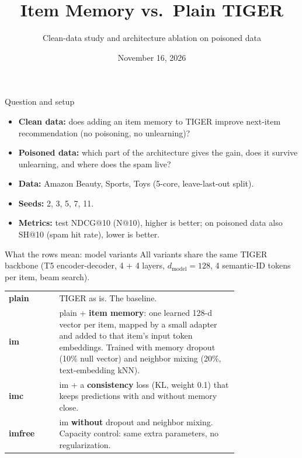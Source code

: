 \documentclass{beamer}
\title{Item Memory vs.\ Plain TIGER}
\subtitle{Clean-data study and architecture ablation on poisoned data}
\date{November 16, 2026}
\begin{document}
\maketitle

\begin{frame}{Question and setup}
\begin{itemize}
  \item \textbf{Clean data:} does adding an item memory to TIGER improve
        next-item recommendation (no poisoning, no unlearning)?
  \item \textbf{Poisoned data:} which part of the architecture gives the
        gain, does it survive unlearning, and where does the spam live?
  \item \textbf{Data:} Amazon Beauty, Sports, Toys (5-core, leave-last-out split).
  \item \textbf{Seeds:} 2, 3, 5, 7, 11.
  \item \textbf{Metrics:} test NDCG@10 (N@10), higher is better; on poisoned
        data also SH@10 (spam hit rate), lower is better.
\end{itemize}
\end{frame}

\begin{frame}{What the rows mean: model variants}
All variants share the same TIGER backbone (T5 encoder-decoder, 4 + 4 layers,
$d_{\text{model}}=128$, 4 semantic-ID tokens per item, beam search).
\medskip

\small
\begin{tabular}{@{}l p{0.78\linewidth}@{}}
\toprule
\textbf{plain}  & TIGER as is. The baseline. \\
\textbf{im}     & plain + \textbf{item memory}: one learned 128-d vector per
                  item, mapped by a small adapter and added to that item's
                  input token embeddings. Trained with memory dropout (10\%
                  null vector) and neighbor mixing (20\%, text-embedding kNN). \\
\textbf{imc}    & im + a \textbf{consistency} loss (KL, weight 0.1) that keeps
                  predictions with and without memory close. \\
\textbf{imfree} & im \textbf{without} dropout and neighbor mixing. Capacity
                  control: same extra parameters, no regularization. \\
\bottomrule
\end{tabular}
\end{frame}
\end{document}
